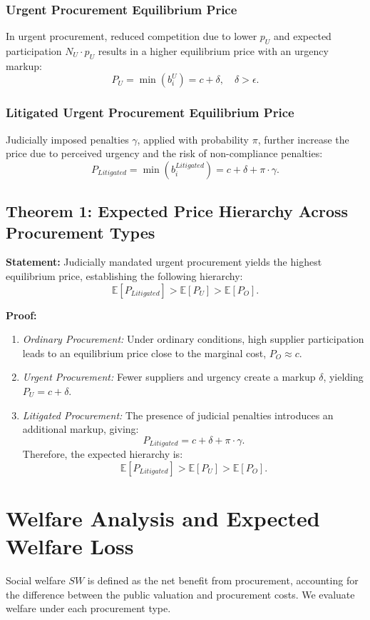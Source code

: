 \documentclass[12pt]{article}
\begin{document}
\subsubsection{Urgent Procurement Equilibrium Price}
In urgent procurement, reduced competition due to lower \( p_U \) and expected participation \( N_U \cdot p_U \) results in a higher equilibrium price with an urgency markup:
\[
P_U = \min(b_i^{U}) = c + \delta, \quad \delta > \epsilon.
\]

\subsubsection{Litigated Urgent Procurement Equilibrium Price}
Judicially imposed penalties \( \gamma \), applied with probability \( \pi \), further increase the price due to perceived urgency and the risk of non-compliance penalties:
\[
P_{Litigated} = \min(b_i^{Litigated}) = c + \delta + \pi \cdot \gamma.
\]

\subsection{Theorem 1: Expected Price Hierarchy Across Procurement Types}

\textbf{Statement:} Judicially mandated urgent procurement yields the highest equilibrium price, establishing the following hierarchy:
\[
\mathbb{E}[P_{Litigated}] > \mathbb{E}[P_U] > \mathbb{E}[P_O].
\]

\textbf{Proof:}
\begin{enumerate}
    \item \textit{Ordinary Procurement:} Under ordinary conditions, high supplier participation leads to an equilibrium price close to the marginal cost, \( P_O \approx c \).
    
    \item \textit{Urgent Procurement:} Fewer suppliers and urgency create a markup \( \delta \), yielding \( P_U = c + \delta \).
    
    \item \textit{Litigated Procurement:} The presence of judicial penalties introduces an additional markup, giving:
    \[
    P_{Litigated} = c + \delta + \pi \cdot \gamma.
    \]
    Therefore, the expected hierarchy is:
    \[
    \mathbb{E}[P_{Litigated}] > \mathbb{E}[P_U] > \mathbb{E}[P_O].
    \]
\end{enumerate}

\section{Welfare Analysis and Expected Welfare Loss}
Social welfare \( SW \) is defined as the net benefit from procurement, accounting for the difference between the public valuation and procurement costs. We evaluate welfare under each procurement type.
\end{document}
